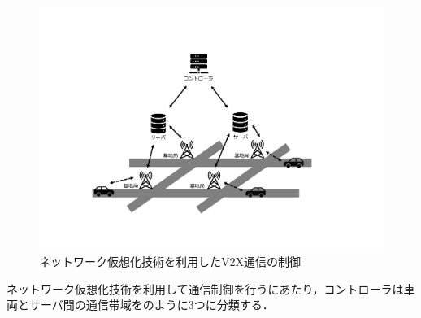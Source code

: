 \documentclass[a4paper,11pt,uplatex]{ujreport}
\begin{document}
\begin{figure}[tb]
  \centering
  \includegraphics[width=\linewidth]{img/ネットワーク仮想化技術を利用したV2X通信の制御.pdf}
  \caption{ネットワーク仮想化技術を利用したV2X通信の制御}
  \label{fig:NV}
\end{figure}

ネットワーク仮想化技術を利用して通信制御を行うにあたり，コントローラは車両とサーバ間の通信帯域をのように3つに分類する．
\end{document}
